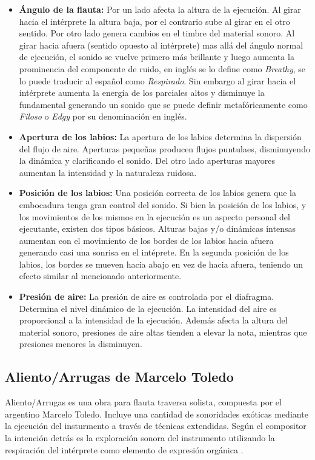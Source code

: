 \documentclass{article}
\begin{document}
\begin{itemize}
  \item \textbf{Ángulo de la flauta:} Por un lado afecta la altura de la ejecución. Al girar hacia el intérprete la altura baja, por el contrario sube al girar en el otro sentido. Por otro lado genera cambios en el timbre del material sonoro. Al girar hacia afuera (sentido opuesto al intérprete) mas allá del ángulo normal de ejecución, el sonido se vuelve primero más brillante y luego aumenta la prominencia del componente de ruido, en inglés se lo define como \textit {Breathy}, se lo puede traducir al español como \textit{Respirado}. Sin embargo al girar hacia el intérprete aumenta la energía de los parciales altos y disminuye la fundamental generando un sonido que se puede definir metafóricamente como \textit{Filoso} o \textit{Edgy} por su denominación en inglés.
  \item \textbf{Apertura de los labios:} La apertura de los labios determina la dispersión del flujo de aire. Aperturas pequeñas producen flujos puntulaes, disminuyendo la dinámica y clarificando el sonido. Del otro lado aperturas mayores aumentan la intensidad y la naturaleza ruidosa.   
  \item \textbf{Posición de los labios:} Una posición correcta de los labios genera que la embocadura tenga gran control del sonido. Si bien la posición de los labios, y los movimientos de los mismos en la ejecución es un aspecto personal del ejecutante, existen dos tipos básicos. Alturas bajas y/o dinámicas intensas aumentan con el movimiento de los bordes de los labios hacia afuera generando casi una sonrisa en el intéprete. En la segunda posición de los labios, los bordes se mueven hacia abajo en vez de hacia afuera, teniendo un efecto similar al mencionado anteriormente.	
  \item \textbf{Presión de aire:} La presión de aire es controlada por el diafragma. Determina el nivel dinámico de la ejecución. La intensidad del aire es proporcional a la intensidad de la ejecución. Además afecta la altura del material sonoro, presiones de aire altas tienden a elevar la nota, mientras que presiones menores la disminuyen.	
\end{itemize}
\medskip 

\subsection{Aliento/Arrugas de Marcelo Toledo}
\label{aliento}
Aliento/Arrugas es una obra para flauta traversa solista, compuesta por el argentino Marcelo Toledo. Incluye una cantidad de sonoridades exóticas mediante la ejecución del insturmento a través de técnicas extendidas. Según el compositor la intención detrás es la exploración sonora del instrumento utilizando la respiración del intérprete como elemento de expresión orgánica \citep{candelaria2005argentine}.  
\medskip
\end{document}
